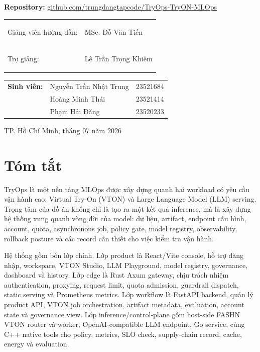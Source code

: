 \documentclass[12pt,a4paper,oneside]{report}
\begin{document}
\begin{titlepage}
  {\normalsize\textbf{Repository:} \href{https://github.com/trungdangtapcode/TryOps-TryON-MLOps}{github.com/trungdangtapcode/TryOps-TryON-MLOps}\par}

  \vspace{0.58cm}
  \begin{tabular}{>{\bfseries\raggedright\arraybackslash}p{4.9cm}p{6.5cm}}
    Giảng viên hướng dẫn: & MSc. Đỗ Văn Tiến \\
    Trợ giảng: & Lê Trần Trọng Khiêm \\
  \end{tabular}

  \vspace{0.58cm}
  \begin{tabular}{>{\bfseries}p{2.2cm}p{6.4cm}p{2.9cm}}
    Sinh viên: & Nguyễn Trần Nhật Trung & 23521684 \\
               & Hoàng Minh Thái & 23521414 \\
               & Phạm Hải Đăng & 23520233 \\
  \end{tabular}

  \vfill
  {\large TP. Hồ Chí Minh, tháng 07 năm 2026\par}
\end{titlepage}


\chapter*{Tóm tắt}

TryOps là một nền tảng MLOps được xây dựng quanh hai workload có yêu cầu vận hành cao: Virtual Try-On (VTON) và Large Language Model (LLM) serving. Trọng tâm của đồ án không chỉ là tạo ra một kết quả inference, mà là xây dựng hệ thống xung quanh vòng đời của model: dữ liệu, artifact, endpoint cấu hình, account, quota, asynchronous job, policy gate, model registry, observability, rollback posture và các record cần thiết cho việc kiểm tra vận hành.

Hệ thống gồm bốn lớp chính. Lớp product là React/Vite console, hỗ trợ đăng nhập, workspace, VTON Studio, LLM Playground, model registry, governance, dashboard và history. Lớp edge là Rust Axum gateway, chịu trách nhiệm authentication, proxying, request limit, quota admission, guardrail dispatch, static serving và Prometheus metrics. Lớp workflow là FastAPI backend, quản lý product API, VTON job orchestration, artifact metadata, evaluation, account state và governance view. Lớp inference/control-plane gồm host-side FASHN VTON router và worker, OpenAI-compatible LLM endpoint, Go service, cùng C++ native tools cho policy, metrics, SLO check, supply-chain record, cache, energy và evaluation.
\end{document}
